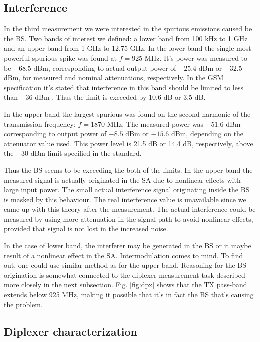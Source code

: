 \documentclass[a4paper, 12pt]{article}
\begin{document}
\subsection{Interference}
\label{s:int}

In the third measurement we were interested in the spurious emissions caused be the 
BS. Two bands of interest we defined: a lower band from 100 kHz to 1 GHz and an upper 
band from 1 GHz to 12.75 GHz. In the lower band the single most powerful spurious spike 
was found at $f = 925$ MHz. It's power was measured to be $-68.5$ dBm, corresponding to 
actual output power of $-25.4$ dBm or $-32.5$ dBm, for measured and nominal attenuations, 
respectively. In the GSM specification it's stated that interference in this band should 
be limited to less than $-36$ dBm \cite{lab1}. Thus the limit is exceeded by $10.6$ dB 
or $3.5$ dB.

In the upper band the largest spurious was found on the second harmonic of the transmission 
frequency: $f = 1870$ MHz. The measured power was $-51.6$ dBm corresponding to output 
power of $-8.5$ dBm or $-15.6$ dBm, depending on the attenuator value used. This power 
level is 21.5 dB or 14.4 dB, respectively, above the $-30$ dBm limit specified in the 
standard.

Thus the BS seems to be exceeding the both of the limits. In the upper band the measured 
signal is actually originated in the SA due to nonlinear effects with large input power. 
The small actual interference signal originating inside the BS is masked by this behaviour. 
The real interference value is unavailable since we came up with this theory after the 
measurement. The actual interference could be measured by using more attenuation in the 
signal path to avoid nonlinear effects, provided that signal is not lost in the increased 
noise.

In the case of lower band, the interferer may be generated in the BS or it maybe result 
of a nonlinear effect in the SA. Intermodulation comes to mind. To find out, one could use 
similar method as for the upper band. Reasoning for the BS origination is somewhat connected 
to the diplexer measurement task described more closely in the next subsection. Fig. 
\ref{fig:dpx} shows that the TX pass-band extends below 925 MHz, making it possible that
it's in fact the BS that's causing the problem.


\subsection{Diplexer characterization}
\end{document}
